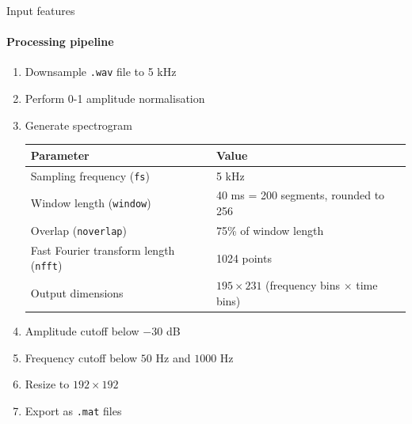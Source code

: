 \documentclass[]{beamer}
\begin{document}
\begin{frame}{Input features}
    \framesubtitle{Processing pipeline}
    \begin{enumerate}
        \item Downsample \texttt{.wav} file to 5 kHz 
        \item Perform 0-1 amplitude normalisation
        \item Generate spectrogram 
        {\scriptsize
            \begin{table}[htbp]
                \centering
                \begin{tabular}{@{}ll@{}} \toprule 
                \textbf{Parameter} & \textbf{Value} \\ \midrule 
                Sampling frequency (\texttt{fs}) & 5 kHz \\ 
                Window length (\texttt{window}) & 40 ms = 200 segments, rounded to 256 \\ 
                Overlap (\texttt{noverlap}) & 75\% of window length \\ 
                Fast Fourier transform length (\texttt{nfft}) & 1024 points \\ 
                Output dimensions & $195 \times 231$ (frequency bins $\times$ time bins) \\ \bottomrule
                \end{tabular}
            \end{table}
        }
        \item Amplitude cutoff below $-30$ dB
        \item Frequency cutoff below $50$ Hz and $1000$ Hz
        \item Resize to $192 \times 192$
        \item Export as \texttt{.mat} files
    \end{enumerate}
\end{frame}
\end{document}
